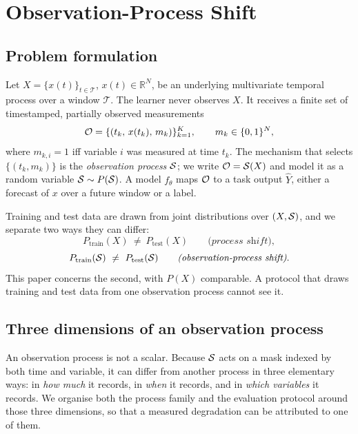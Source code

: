 
\section{Observation-Process Shift}
\label{sec:problem}

\subsection{Problem formulation}
Let $X=\{x(t)\}_{t\in\mathcal{T}}$, $x(t)\in\mathbb{R}^{N}$, be an underlying multivariate temporal process over
a window $\mathcal{T}$. The learner never observes $X$. It receives a finite set of timestamped, partially
observed measurements
\begin{equation}
\mathcal{O}=\{(t_k,\,x(t_k),\,m_k)\}_{k=1}^{K},\qquad m_k\in\{0,1\}^{N},
\end{equation}
where $m_{k,i}=1$ iff variable $i$ was measured at time $t_k$. The mechanism that selects $\{(t_k,m_k)\}$ is the
\emph{observation process} $\mathcal{S}$; we write $\mathcal{O}=\mathcal{S}(X)$ and model it as a random variable
$\mathcal{S}\sim P(\mathcal{S})$. A model $f_\theta$ maps $\mathcal{O}$ to a task output $\hat Y$, either a forecast of $x$ over a
future window or a label.

Training and test data are drawn from joint distributions over $(X,\mathcal{S})$, and we separate two ways they can
differ:
\begin{equation}
P_{\mathrm{train}}(X)\ \neq\ P_{\mathrm{test}}(X)
\qquad\textit{(process shift)},
\end{equation}
\begin{equation}
P_{\mathrm{train}}(\Sobs)\ \neq\ P_{\mathrm{test}}(\Sobs)
\qquad\textit{(observation-process shift)}.
\end{equation}
This paper concerns the second, with $P(X)$ comparable. A protocol that draws training and test data from one
observation process cannot see it.

\subsection{Three dimensions of an observation process}
\label{sec:family}
An observation process is not a scalar. Because $\mathcal{S}$ acts on a mask indexed by both time and variable, it can
differ from another process in three elementary ways: in \emph{how much} it records, in \emph{when} it records,
and in \emph{which variables} it records. We organise both the process family and the evaluation protocol around
those three dimensions, so that a measured degradation can be attributed to one of them.

